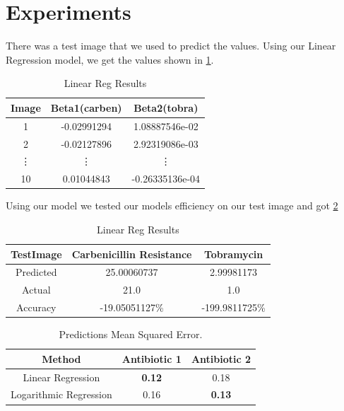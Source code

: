 \documentclass[conference]{IEEEtran}
\begin{document}
\section{Experiments}

There was a test image that we used to predict the values. Using our Linear Regression model, we get the values shown in \ref{tabLinearReg}.
\begin{table}[h]
\begin{center}
\begin{tabular}{| c || c | c |}
\hline
Image & Beta1(carben) & Beta2(tobra) \\ \hline \hline
1 & -0.02991294 & 1.08887546e-02 \\ \hline
2 & -0.02127896 & 2.92319086e-03 \\ \hline
\vdots & \vdots & \vdots \\ \hline
10 & 0.01044843 & -0.26335136e-04 \\ \hline
\end{tabular}
\caption{Linear Reg Results}
\label{tabLinearReg}
\end{center}
\end{table}

\begin{table}[h]
 Using our model we tested our models efficiency on our test image and got \ref{tabLinearRegResults}
\begin{center}
\begin{tabular}{| c || c | c |}
\hline
TestImage & Carbenicillin Resistance & Tobramycin \\ \hline \hline
Predicted & 25.00060737 & 2.99981173 \\ \hline
Actual & 21.0 & 1.0 \\ \hline
Accuracy & -19.05051127\% & -199.9811725\% \\ \hline
\end{tabular}
\caption{Linear Reg Results}
\label{tabLinearRegResults}
\end{center}
\end{table}

\begin{table}[h]
\begin{center}
\begin{tabular}{| c || c | c |}
\hline
Method & Antibiotic 1 & Antibiotic 2 \\ \hline \hline
Linear Regression & \textbf{0.12} & 0.18 \\ \hline
Logarithmic Regression & 0.16 & \textbf{0.13} \\ \hline
\end{tabular}
\caption{Predictions Mean Squared Error.}
\label{tabSummary}
\end{center}
\end{table}
\end{document}
